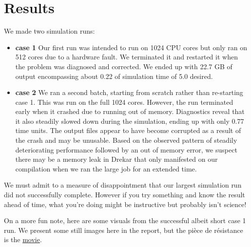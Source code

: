 \documentclass[11pt]{article} %
\begin{document}
\section{Results}
We made two simulation runs:
\begin{itemize}
\item{\textbf{case 1}} Our first run was intended to run on 1024 CPU cores but only ran on 512 cores due to a hardware fault.
We terminated it and restarted it when the problem was diagnosed and corrected.  We ended up with 22.7 GB of output
encompassing about 0.22 of simulation time of 5.0 desired.
\item{\textbf{case 2}} We ran a second batch, starting from scratch rather than re-starting case 1.
This was run on the full 1024 cores.  However, the run terminated early when it crashed due to running out of memory.
Diagnostics reveal that it also steadily slowed down during the simulation, ending up with only 0.77 time units.
The output files appear to have become corrupted as a result of the crash and may be unusable.
Based on the observed pattern of steadily deteriorating performance followed by an out of memory error,
we suspect there may be a memory leak in Drekar that only manifested on our compilation when we ran
the large job for an extended time.
\end{itemize}

We must admit to a measure of disappointment that our largest simulation run did not successfully complete.
However if you try something and know the result ahead of time, 
what you're doing might be instructive but probably isn't science!

On a more fun note, here are some visuals from the successful albeit short case 1 run.
We present some still images here in the report, but the pi\`ece de r\'esistance 
is the \href{https://youtu.be/1DIGnRgUhe4}{movie}.

\newpage
\end{document}
